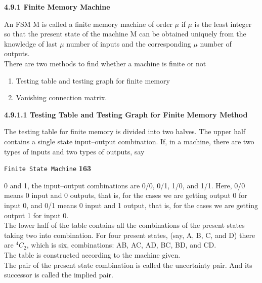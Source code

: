 \documentclass[10pt]{article}
\begin{document}
\vspace*{0.4cm}

\large{
\textbf{4.9.1 Finite Memory Machine}\\
}

\vspace*{0.2cm}

An FSM M is called a finite memory machine of order $\mu$ if $\mu$ is the least integer so that the present state
of the machine M can be obtained uniquely from the knowledge of last $\mu$ number of inputs and the
corresponding $\mu$ number of outputs.\\
\hspace*{0.5cm} There are two methods to find whether a machine is finite or not\\


\vspace*{0.1cm}
\begin{enumerate}
  \item Testing table and testing graph for finite memory\\
  \item Vanishing connection matrix.\\
\end{enumerate}

\vspace*{0.4cm}
\large{
\textbf{4.9.1.1 Testing Table and Testing Graph for Finite Memory Method}\\
}

\vspace*{0.2cm}

The testing table for finite memory is divided into two halves. The upper half contains a single state
input–output combination. If, in a machine, there are two types of inputs and two types of outputs, say


\newpage
\begin{flushright}
 \texttt{Finite State Machine} \hspace*{1cm} \textbf{163}
\end{flushright}

\vspace*{0.5cm}
0 and 1, the input–output combinations are 0/0, 0/1, 1/0, and 1/1. Here, 0/0 means 0 input and 0 outputs,
that is, for the cases we are getting output 0 for input 0, and 0/1 means 0 input and 1 output, that is, for
the cases we are getting output 1 for input 0.\\
\hspace*{0.5cm} The lower half of the table contains all the combinations of the present states taking two into combination.
For four present states, (say, A, B, C, and D) there are $^{4} C _{2}$, which is six, combinations: AB, AC,
AD, BC, BD, and CD.\\
\hspace{0.5cm} The table is constructed according to the machine given.\\
\hspace{0.5cm} The pair of the present state combination is called the uncertainty pair. And its successor is called
the implied pair.\\
\end{document}
